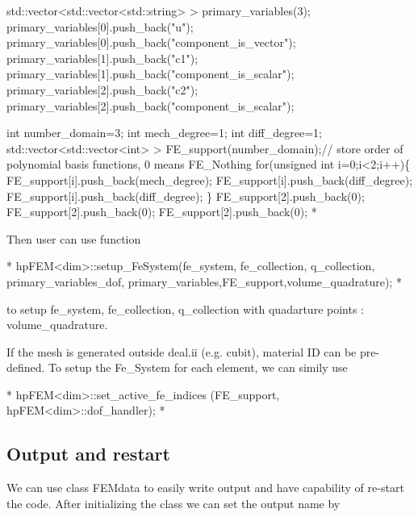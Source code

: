 \begin{DoxyCode}
       std::vector<std::vector<std::string> > primary\_variables(3);        
       primary\_variables[0].push\_back(\textcolor{stringliteral}{"u"}); primary\_variables[0].push\_back(\textcolor{stringliteral}{"component\_is\_vector"});
       primary\_variables[1].push\_back(\textcolor{stringliteral}{"c1"}); primary\_variables[1].push\_back(\textcolor{stringliteral}{"component\_is\_scalar"});
       primary\_variables[2].push\_back(\textcolor{stringliteral}{"c2"}); primary\_variables[2].push\_back(\textcolor{stringliteral}{"component\_is\_scalar"});
       
       \textcolor{keywordtype}{int} number\_domain=3;
       \textcolor{keywordtype}{int} mech\_degree=1;
       \textcolor{keywordtype}{int} diff\_degree=1;
       std::vector<std::vector<int> > FE\_support(number\_domain);\textcolor{comment}{// store order of polynomial basis
       functions, 0 means FE\_Nothing   }
       \textcolor{keywordflow}{for}(\textcolor{keywordtype}{unsigned} \textcolor{keywordtype}{int} i=0;i<2;i++)\{
           FE\_support[i].push\_back(mech\_degree);
           FE\_support[i].push\_back(diff\_degree);
           FE\_support[i].push\_back(diff\_degree);
       \}
       FE\_support[2].push\_back(0);
       FE\_support[2].push\_back(0);
       FE\_support[2].push\_back(0);
*
\end{DoxyCode}
 Then user can use function 
\begin{DoxyCode}
 *  hpFEM<dim>::setup_FeSystem(fe\_system, fe\_collection, q\_collection, primary\_variables\_dof,
      primary\_variables,FE\_support,volume\_quadrature);
* 
\end{DoxyCode}
 to setup {\ttfamily fe\-\_\-system}, {\ttfamily fe\-\_\-collection}, {\ttfamily q\-\_\-collection} with quadarture points \-: {\ttfamily volume\-\_\-quadrature}.\par
 If the mesh is generated outside deal.\-ii (e.\-g. cubit), material I\-D can be pre-\/defined. To setup the {\ttfamily Fe\-\_\-\-System} for each element, we can simily use 
\begin{DoxyCode}
 *  hpFEM<dim>::set_active_fe_indices (FE\_support, hpFEM<dim>::dof_handler);
* 
\end{DoxyCode}
 \hypertarget{_intercalation_outPut}{}\subsection{Output and restart}\label{_intercalation_outPut}
We can use class {\ttfamily F\-E\-Mdata} to easily write output and have capability of re-\/start the code. After initializing the class we can set the output name by 
